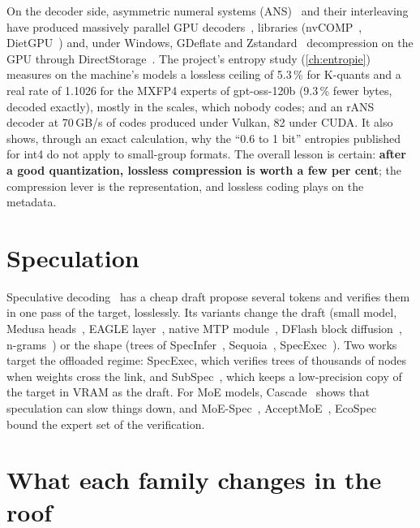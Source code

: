 On the decoder side, asymmetric numeral systems (ANS)~\cite{duda2013ans} and their interleaving~\cite{giesen2014interleaved} have produced massively parallel GPU decoders~\cite{weissenberger2019multians,lin2023recoil}, libraries (nvCOMP~\cite{nvcomp2026}, DietGPU~\cite{dietgpu}) and, under Windows, GDeflate and Zstandard~\cite{zstd} decompression on the GPU through DirectStorage~\cite{directstorage14}. The project's entropy study (\cref{ch:entropie}) measures on the machine's models a lossless ceiling of 5.3\,\% for K-quants and a real rate of 1.1026 for the MXFP4 experts of gpt-oss-120b (9.3\,\% fewer bytes, decoded exactly), mostly in the scales, which nobody codes; and an rANS decoder at 70\,GB/s of codes produced under Vulkan, 82 under CUDA. It also shows, through an exact calculation, why the ``0.6 to 1 bit'' entropies published for int4 do not apply to small-group formats. The overall lesson is certain: \textbf{after a good quantization, lossless compression is worth a few per cent}; the compression lever is the representation, and lossless coding plays on the metadata.

\section{Speculation}\label{sec:etat-spec}

Speculative decoding~\cite{leviathan2023,chen2023spec} has a cheap draft propose several tokens and verifies them in one pass of the target, losslessly. Its variants change the draft (small model, Medusa heads~\cite{medusa2024}, EAGLE layer~\cite{eagle2_2024,eagle3_2025}, native MTP module~\cite{gloeckle2024,deepseekv3_2024}, DFlash block diffusion~\cite{dflash2026}, n-grams~\cite{lookahead2024}) or the shape (trees of SpecInfer~\cite{specinfer2023}, Sequoia~\cite{sequoia2024}, SpecExec~\cite{specexec2024}). Two works target the offloaded regime: SpecExec, which verifies trees of thousands of nodes when weights cross the link, and SubSpec~\cite{subspec2025}, which keeps a low-precision copy of the target in VRAM as the draft. For MoE models, Cascade~\cite{cascade2025} shows that speculation can slow things down, and MoE-Spec~\cite{moespec2026}, AcceptMoE~\cite{acceptmoe2026}, EcoSpec~\cite{ecospec2026} bound the expert set of the verification.

\section{What each family changes in the roof}\label{sec:etat-leviers}

